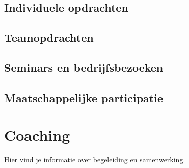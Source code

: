 \documentclass[]{book}
\begin{document}
\section{Individuele opdrachten}\label{individuele-opdrachten}

\section{Teamopdrachten}\label{teamopdrachten}

\section{Seminars en
bedrijfsbezoeken}\label{seminars-en-bedrijfsbezoeken}

\section{Maatschappelijke
participatie}\label{maatschappelijke-participatie}

\chapter{Coaching}\label{coaching}

Hier vind je informatie over begeleiding en samenwerking.


\end{document}
